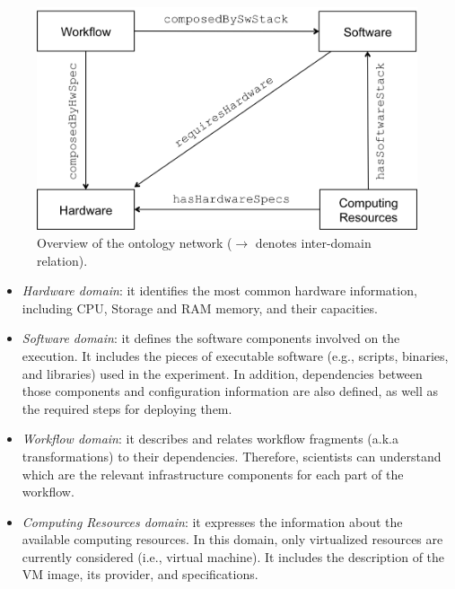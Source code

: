 \begin{figure}[!t]
	\centering
	\includegraphics[width=.9\linewidth]{figures/wicusrels}
	\caption{Overview of the ontology network ($\rightarrow$ denotes inter-domain relation).}
	\label{fig:wicusrels}
\end{figure}

\begin{itemize}
	\setlength{\itemsep}{1pt}
	\setlength{\parskip}{0pt}
	\setlength{\parsep}{0pt}

	\item{\emph{Hardware domain}}: it identifies the most common hardware information, 
		including CPU, Storage and RAM memory, and their capacities.
	
	\item{\emph{Software domain}}: it defines the software components involved on the execution. 
    		It includes the pieces of executable software (e.g., scripts, binaries, and libraries) used in 
		the experiment. In addition, dependencies between those components and configuration 
		information are also defined, as well as the required steps for deploying them.
	
	\item{\emph{Workflow domain}}: it describes and relates workflow fragments (a.k.a transformations) 
    		to their dependencies. Therefore, scientists can understand which are the relevant infrastructure 
		components for each part of the workflow.
	
	\item{\emph{Computing Resources domain}}: it expresses the information about the available 
    		computing resources. In this domain, only virtualized resources are currently considered 
		(i.e., virtual machine). It includes the description of the VM image, its provider, and specifications.
\end{itemize}



